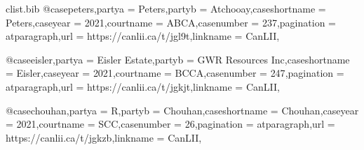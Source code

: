 \begin{filecontents*}[overwrite]{clist\jobname.bib}
@case{peters,partya =  {Peters},partyb =  {Atchooay},caseshortname =  {Peters},caseyear =  {2021},courtname =  {ABCA},casenumber =  {237},pagination =  {atparagraph},url =  {https://canlii.ca/t/jgl9t},linkname =  {CanLII},}

@case{eisler,partya =  {Eisler Estate},partyb =  {GWR Resources Inc},caseshortname =  {Eisler},caseyear =  {2021},courtname =  {BCCA},casenumber =  {247},pagination =  {atparagraph},url =  {https://canlii.ca/t/jgkjt},linkname =  {CanLII},}


@case{chouhan,partya =  {R},partyb =  {Chouhan},caseshortname =  {Chouhan},caseyear =  {2021},courtname =  {SCC},casenumber =  {26},pagination =  {atparagraph},url =  {https://canlii.ca/t/jgkzb},linkname =  {CanLII},}

\end{filecontents*}



